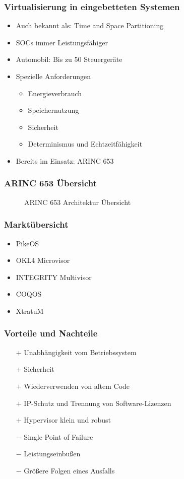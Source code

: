 \documentclass[]{beamer}
\newcommand{\inputImage}[1]{}
\begin{document}
\begin{frame}
\frametitle{Virtualisierung in eingebetteten Systemen}
    \begin{itemize}
        \item Auch bekannt als: Time and Space Partitioning
        \item SOCs immer Leistungsfähiger
        \item Automobil: Bis zu 50 Steuergeräte
        \item Spezielle Anforderungen
        \begin{itemize}
            \item Energieverbrauch
            \item Speichernutzung
            \item Sicherheit
            \item Determinismus und Echtzeitfähigkeit
        \end{itemize}
        \item Bereits im Einsatz: ARINC 653
    \end{itemize}
\end{frame}


\begin{frame}
\frametitle{ARINC 653 Übersicht}
    \begin{figure}[ht]
        \centering
        \resizebox{0.65\linewidth}{!}{\inputImage{arinc653.dia}}
        \caption{ARINC 653 Architektur Übersicht}
        \label{fig:arinc_653}
    \end{figure}
\end{frame}

\begin{frame}
\frametitle{Marktübersicht}
    \begin{itemize}
        \item PikeOS
        \item OKL4 Microvisor
        \item INTEGRITY Multivisor
        \item COQOS
        \item XtratuM
    \end{itemize}
\end{frame}

\begin{frame}
\frametitle{Vorteile und Nachteile}
    \begin{itemize}
        \item[$ + $] Unabhängigkeit vom Betriebssystem
        \item[$ + $] Sicherheit
        \item[$ + $] Wiederverwenden von altem Code
        \item[$ + $] IP-Schutz und Trennung von Software-Lizenzen
        \item[$ + $] Hypervisor klein und robust

        \item[$ - $] Single Point of Failure
        \item[$ - $] Leistungseinbußen
        \item[$ - $] Größere Folgen eines Ausfalls
    \end{itemize}
\end{frame}
\end{document}
